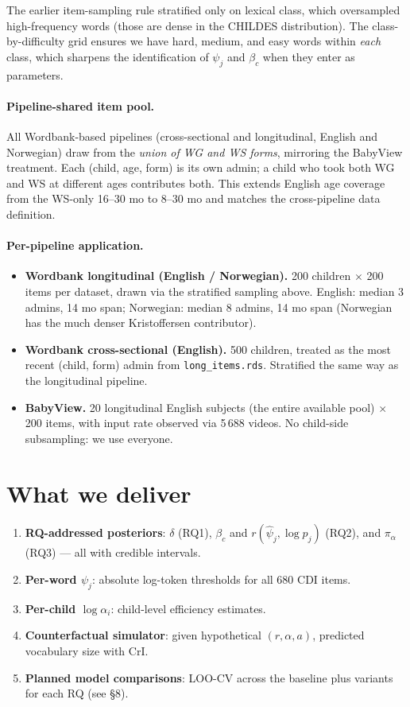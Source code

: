 \documentclass[11pt]{article}
\begin{document}
The earlier item-sampling rule stratified only on lexical class, which
oversampled high-frequency words (those are dense in the CHILDES
distribution). The class-by-difficulty grid ensures we have hard,
medium, and easy words within \emph{each} class, which sharpens the
identification of \(\psi_j\) and \(\beta_c\) when they enter as
parameters.

\paragraph{Pipeline-shared item pool.} All Wordbank-based pipelines
(cross-sectional and longitudinal, English and Norwegian) draw from
the \emph{union of WG and WS forms}, mirroring the BabyView treatment.
Each (child, age, form) is its own admin; a child who took both WG and
WS at different ages contributes both. This extends English age coverage
from the WS-only 16--30 mo to 8--30 mo and matches the cross-pipeline
data definition.

\paragraph{Per-pipeline application.}
\begin{itemize}[leftmargin=1.3em]
\item \textbf{Wordbank longitudinal (English / Norwegian).} 200
children \(\times\) 200 items per dataset, drawn via the stratified
sampling above. English: median 3 admins, 14 mo span; Norwegian:
median 8 admins, 14 mo span (Norwegian has the much denser
Kristoffersen contributor).
\item \textbf{Wordbank cross-sectional (English).} 500 children,
treated as the most recent (child, form) admin from \texttt{long\_items.rds}.
Stratified the same way as the longitudinal pipeline.
\item \textbf{BabyView.} 20 longitudinal English subjects (the entire
available pool) \(\times\) 200 items, with input rate observed via
5\,688 videos. No child-side subsampling: we use everyone.
\end{itemize}

\section{What we deliver}

\begin{enumerate}[leftmargin=1.3em]
\item \textbf{RQ-addressed posteriors}: \(\delta\) (RQ1),
  \(\beta_c\) and \(r(\hat\psi_j, \log p_j)\) (RQ2), and
  \(\pi_\alpha\) (RQ3) — all with credible intervals.
\item \textbf{Per-word \(\psi_j\)}: absolute log-token thresholds for all
  680 CDI items.
\item \textbf{Per-child \(\log \alpha_i\)}: child-level efficiency
  estimates.
\item \textbf{Counterfactual simulator}: given hypothetical
  \((r, \alpha, a)\), predicted vocabulary size with CrI.
\item \textbf{Planned model comparisons}: LOO-CV across the baseline
  plus variants for each RQ (see §8).
\end{enumerate}
\end{document}
